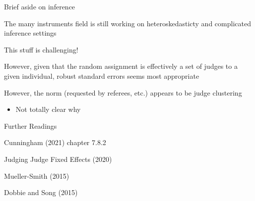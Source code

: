 \documentclass[notes,11pt, aspectratio=169]{beamer}
\newenvironment{wideitemize}{\itemize\addtolength{\itemsep}{10pt}}{\enditemize}
\begin{document}
\begin{frame}{Brief aside on inference}
  \begin{wideitemize}
  \item The many instruments field is still working on heteroskedasticty and complicated inference settings
  \item This stuff is challenging!
  \item However, given that the random assignment is effectively a set
    of judges to a given individual, robust standard errors seems most appropriate
  \item However, the norm (requested by referees, etc.) appears to be judge clustering 
    \begin{itemize}
    \item   Not totally clear why
    \end{itemize}
  \end{wideitemize}
\end{frame}

\begin{frame}{Further Readings}
  \begin{wideitemize}
  \item Cunningham (2021) chapter 7.8.2
  \item Judging Judge Fixed Effects (2020)
  \item Mueller-Smith (2015)
  \item Dobbie and Song (2015)
  \end{wideitemize}
\end{frame}
\end{document}
